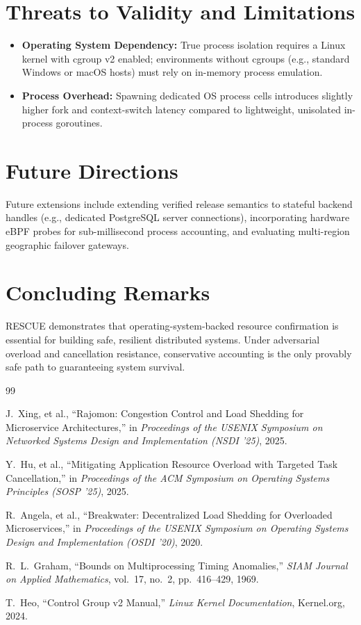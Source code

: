 \documentclass[12pt,a4paper]{report}
\begin{document}
\section{Threats to Validity and Limitations}
\begin{itemize}
    \item \textbf{Operating System Dependency:} True process isolation requires a Linux kernel with cgroup v2 enabled; environments without cgroups (e.g., standard Windows or macOS hosts) must rely on in-memory process emulation.
    \item \textbf{Process Overhead:} Spawning dedicated OS process cells introduces slightly higher fork and context-switch latency compared to lightweight, unisolated in-process goroutines.
\end{itemize}

\section{Future Directions}
Future extensions include extending verified release semantics to stateful backend handles (e.g., dedicated PostgreSQL server connections), incorporating hardware eBPF probes for sub-millisecond process accounting, and evaluating multi-region geographic failover gateways.

\section{Concluding Remarks}
RESCUE demonstrates that operating-system-backed resource confirmation is essential for building safe, resilient distributed systems. Under adversarial overload and cancellation resistance, conservative accounting is the only provably safe path to guaranteeing system survival.

\begin{thebibliography}{99}

J.~Xing, et al., ``Rajomon: Congestion Control and Load Shedding for Microservice Architectures,'' in \textit{Proceedings of the USENIX Symposium on Networked Systems Design and Implementation (NSDI '25)}, 2025.

Y.~Hu, et al., ``Mitigating Application Resource Overload with Targeted Task Cancellation,'' in \textit{Proceedings of the ACM Symposium on Operating Systems Principles (SOSP '25)}, 2025.

R.~Angela, et al., ``Breakwater: Decentralized Load Shedding for Overloaded Microservices,'' in \textit{Proceedings of the USENIX Symposium on Operating Systems Design and Implementation (OSDI '20)}, 2020.

R.~L.~Graham, ``Bounds on Multiprocessing Timing Anomalies,'' \textit{SIAM Journal on Applied Mathematics}, vol.~17, no.~2, pp.~416--429, 1969.

T.~Heo, ``Control Group v2 Manual,'' \textit{Linux Kernel Documentation}, Kernel.org, 2024.

\end{thebibliography}
\end{document}
